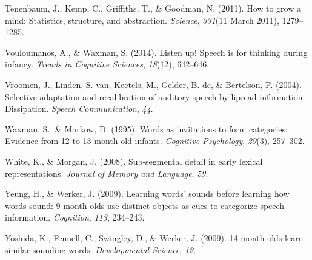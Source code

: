 \documentclass[english,floatsintext,man]{apa6}
\theoremstyle{definition}
\theoremstyle{definition}
\theoremstyle{definition}
\theoremstyle{remark}
\begin{document}
\hypertarget{ref-tenenbaum11}{}
Tenenbaum, J., Kemp, C., Griffiths, T., \& Goodman, N. (2011). How to
grow a mind: Statistics, structure, and abstraction. \emph{Science},
\emph{331}(11 March 2011), 1279--1285.

\hypertarget{ref-vouloumanos2014}{}
Vouloumanos, A., \& Waxman, S. (2014). Listen up! Speech is for thinking
during infancy. \emph{Trends in Cognitive Sciences}, \emph{18}(12),
642--646.

\hypertarget{ref-vroomen2004}{}
Vroomen, J., Linden, S. van, Keetels, M., Gelder, B. de, \& Bertelson,
P. (2004). Selective adaptation and recalibration of auditory speech by
lipread information: Dissipation. \emph{Speech Communication},
\emph{44}.

\hypertarget{ref-waxman1995}{}
Waxman, S., \& Markow, D. (1995). Words as invitations to form
categories: Evidence from 12-to 13-month-old infants. \emph{Cognitive
Psychology}, \emph{29}(3), 257--302.

\hypertarget{ref-white2008b}{}
White, K., \& Morgan, J. (2008). Sub-segmental detail in early lexical
representations. \emph{Journal of Memory and Language}, \emph{59}.

\hypertarget{ref-yeung09}{}
Yeung, H., \& Werker, J. (2009). Learning words' sounds before learning
how words sound: 9-month-olds use distinct objects as cues to categorize
speech information. \emph{Cognition}, \emph{113}, 234--243.

\hypertarget{ref-yoshida2009}{}
Yoshida, K., Fennell, C., Swingley, D., \& Werker, J. (2009).
14-month-olds learn similar-sounding words. \emph{Developmental
Science}, \emph{12}.
\end{document}

